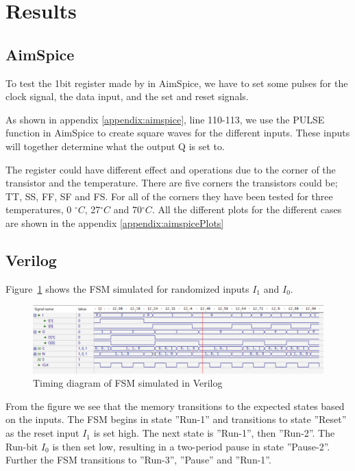 \section{Results}
\label{sec:results}

\subsection{AimSpice}

To test the 1bit register made by in AimSpice, we have to set some pulses for the clock signal, the data input, and the set and reset signals. 

As shown in appendix \ref{appendix:aimspice}, line 110-113, we use the PULSE function in AimSpice to create square waves for the different inputs. These inputs will together determine what the output Q is set to. 

The register could have different effect and operations due to the corner of the transistor and the temperature. There are five corners the transistors could be; TT, SS, FF, SF and FS. For all of the corners they have been tested for three temperatures, 0 $^\circ C$, 27$^\circ C$ and 70$^\circ C$. All the different plots for the different cases are shown in the appendix \ref{appendix:aimspicePlots}

\subsection{Verilog}

Figure~\ref{fig:fsm_simulation} shows the FSM simulated for randomized inputs $I_1$ and $I_0$.

\begin{figure}[H]
    \centering
    \includegraphics[width=\textwidth]{Figures/Test of FSM.png}
    \caption{Timing diagram of FSM simulated in Verilog}
    \label{fig:fsm_simulation}
\end{figure}

From the figure we see that the memory transitions to the expected states based on the inputs. The FSM begins in state ''Run-1'' and transitions to state ''Reset'' as the reset input $I_1$ is set high. The next state is ''Run-1'', then ''Run-2''. The Run-bit $I_0$ is then set low, resulting in a two-period pause in state ''Pause-2''. Further the FSM transitions to ''Run-3'', ''Pause'' and ''Run-1''.

